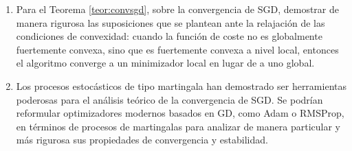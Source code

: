 \begin{enumerate}
	\item Para el Teorema \ref{teor:convsgd}, sobre la convergencia de SGD, demostrar de manera rigurosa las suposiciones que se plantean ante la relajación de las condiciones de convexidad: cuando la función de coste no es globalmente fuertemente convexa, sino que es fuertemente convexa a nivel local, entonces el algoritmo converge a un minimizador local en lugar de a uno global.
	
	\item Los procesos estocásticos de tipo martingala han demostrado ser herramientas poderosas para el análisis teórico de la convergencia de SGD. Se podrían reformular optimizadores modernos basados en GD, como Adam o RMSProp, en términos de procesos de martingalas para analizar de manera particular y más rigurosa sus propiedades de convergencia y estabilidad.
	
\end{enumerate}

